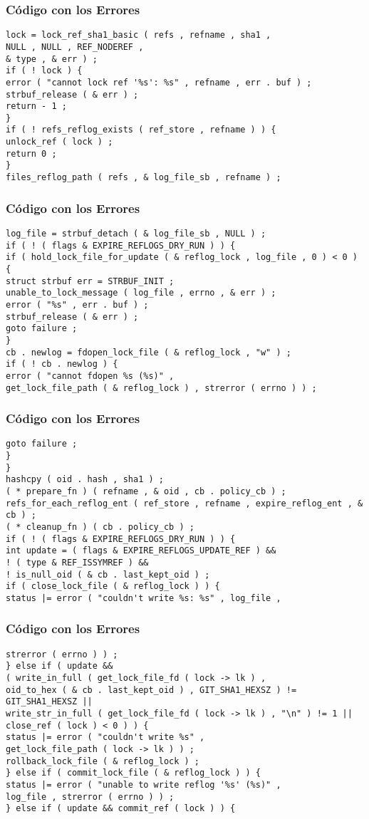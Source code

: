 \documentclass{beamer}
\begin{document}
\begin{frame}[fragile]
\frametitle{C\'odigo con los Errores}
\begin{verbatim}
lock = lock_ref_sha1_basic ( refs , refname , sha1 , 
NULL , NULL , REF_NODEREF , 
& type , & err ) ; 
if ( ! lock ) { 
error ( "cannot lock ref '%s': %s" , refname , err . buf ) ; 
strbuf_release ( & err ) ; 
return - 1 ; 
} 
if ( ! refs_reflog_exists ( ref_store , refname ) ) { 
unlock_ref ( lock ) ; 
return 0 ; 
} 
files_reflog_path ( refs , & log_file_sb , refname ) ; 
\end{verbatim}
\end{frame}
\begin{frame}[fragile]
\frametitle{C\'odigo con los Errores}
\begin{verbatim}
log_file = strbuf_detach ( & log_file_sb , NULL ) ; 
if ( ! ( flags & EXPIRE_REFLOGS_DRY_RUN ) ) { 
if ( hold_lock_file_for_update ( & reflog_lock , log_file , 0 ) < 0 ) { 
struct strbuf err = STRBUF_INIT ; 
unable_to_lock_message ( log_file , errno , & err ) ; 
error ( "%s" , err . buf ) ; 
strbuf_release ( & err ) ; 
goto failure ; 
} 
cb . newlog = fdopen_lock_file ( & reflog_lock , "w" ) ; 
if ( ! cb . newlog ) { 
error ( "cannot fdopen %s (%s)" , 
get_lock_file_path ( & reflog_lock ) , strerror ( errno ) ) ; 
\end{verbatim}
\end{frame}
\begin{frame}[fragile]
\frametitle{C\'odigo con los Errores}
\begin{verbatim}
goto failure ; 
} 
} 
hashcpy ( oid . hash , sha1 ) ; 
( * prepare_fn ) ( refname , & oid , cb . policy_cb ) ; 
refs_for_each_reflog_ent ( ref_store , refname , expire_reflog_ent , & cb ) ; 
( * cleanup_fn ) ( cb . policy_cb ) ; 
if ( ! ( flags & EXPIRE_REFLOGS_DRY_RUN ) ) { 
int update = ( flags & EXPIRE_REFLOGS_UPDATE_REF ) && 
! ( type & REF_ISSYMREF ) && 
! is_null_oid ( & cb . last_kept_oid ) ; 
if ( close_lock_file ( & reflog_lock ) ) { 
status |= error ( "couldn't write %s: %s" , log_file , 
\end{verbatim}
\end{frame}
\begin{frame}[fragile]
\frametitle{C\'odigo con los Errores}
\begin{verbatim}
strerror ( errno ) ) ; 
} else if ( update && 
( write_in_full ( get_lock_file_fd ( lock -> lk ) , 
oid_to_hex ( & cb . last_kept_oid ) , GIT_SHA1_HEXSZ ) != GIT_SHA1_HEXSZ || 
write_str_in_full ( get_lock_file_fd ( lock -> lk ) , "\n" ) != 1 || 
close_ref ( lock ) < 0 ) ) { 
status |= error ( "couldn't write %s" , 
get_lock_file_path ( lock -> lk ) ) ; 
rollback_lock_file ( & reflog_lock ) ; 
} else if ( commit_lock_file ( & reflog_lock ) ) { 
status |= error ( "unable to write reflog '%s' (%s)" , 
log_file , strerror ( errno ) ) ; 
} else if ( update && commit_ref ( lock ) ) { 
\end{verbatim}
\end{frame}
\end{document}
